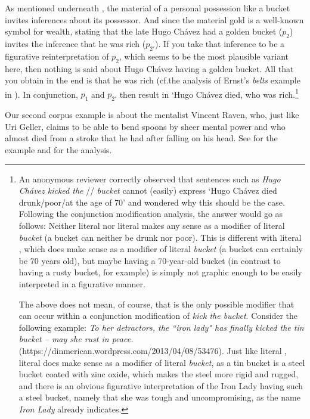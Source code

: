 \documentclass[output=paper]{langsci/langscibook}
\begin{document}
\noindent As mentioned underneath , the material of a personal possession like a bucket invites inferences about its possessor. And since the material gold is a well-known symbol for wealth, stating that the late Hugo Ch\'avez had a golden bucket ($p_{2}$) invites the inference that he was rich ($p_{2'}$). If you take that inference to be a figurative reinterpretation of $p_{2}$, which seems to be the most plausible variant here, then nothing is said about Hugo Ch\'avez having a golden bucket. All that you obtain in the end is that he was rich (cf.\@ the analysis of Ernst's \underline{} \textit{belts} example in ). In conjunction, $p_{1}$ and $p_{2'}$ then result in `Hugo Ch\'avez died, who was rich.\footnote{An anonymous reviewer correctly observed that sentences such as \textit{Hugo Ch\'{a}vez kicked the} \underline{}/\underline{}/\underline{} \textit{bucket} cannot (easily) express `Hugo Ch\'{a}vez died drunk/poor/at the age of 70' and wondered why this should be the case. Following the conjunction modification analysis, the answer would go as follows: Neither literal \underline{} nor literal \underline{} makes any sense as a modifier of literal \textit{bucket} (a bucket can neither be drunk nor poor). This is different with literal \underline{}, which does make sense as a modifier of literal \textit{bucket} (a bucket can certainly be 70 years old), but maybe having a 70-year-old bucket (in contrast to having a rusty bucket, for example) is simply not graphic enough to be easily interpreted in a figurative manner.

The above does not mean, of course, that \underline{} is the only possible modifier that can occur within a conjunction modification of \textit{kick the bucket}. Consider the following example: \textit{To her detractors, the ``iron lady" has finally kicked the tin bucket -- may she rust in peace.} (https://dinmerican.wordpress.com/2013/04/08/53476). Just like literal \underline{}, literal \underline{} does make sense as a modifier of literal \textit{bucket}, as a tin bucket is a steel bucket coated with zinc oxide, which makes the steel more rigid and rugged, and there is an obvious figurative interpretation of the Iron Lady having such a steel bucket, namely that she was tough and uncompromising, as the name \textit{Iron Lady} already indicates.}

Our second corpus example is about the mentalist Vincent Raven, who, just like Uri Geller, claims to be able to bend spoons by sheer mental power and who almost died from a stroke that he had after falling on his head. See  for the example and  for the analysis.
\end{document}
